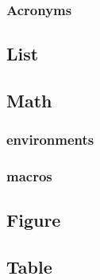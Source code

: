         \subsubsection{Acronyms}
        \label{sec:tutorial/latex/crossref/acronyms}
        
        
    \subsection{List}
    \label{sec:tutorial/latex/list}
    

    \subsection{Math}
    \label{sec:tutorial/latex/math}
    
    
        \subsubsection*{\thesubsubsection\hspace{1em}\Glspl{environment}}
        \label{sec:tutorial/latex/math/env}
        

        \subsubsection*{\thesubsubsection\hspace{1em}\Glspl{macro}}
        \label{sec:tutorial/latex/math/cmds}
        

    \subsection{Figure}
    \label{sec:tutorial/latex/fig}
    

    \subsection{Table}
    \label{sec:tutorial/latex/table}
    
    
